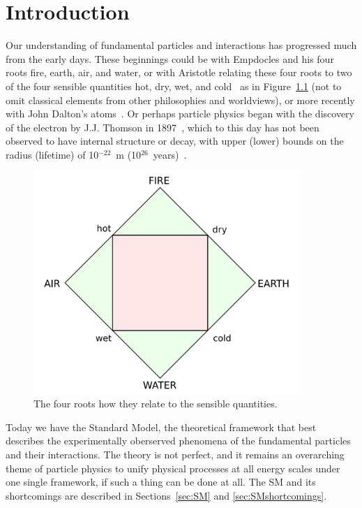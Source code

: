 
\chapter{Introduction\label{ch:intro}}

Our understanding of fundamental particles and interactions has progressed much from the early days.
These beginnings could be with Empdocles and his four roots fire, earth, air, and water, or with
Aristotle relating these four roots to two of the four sensible quantities hot, dry, wet, and
cold~\cite{0415078547} as in Figure~\ref{fig:aristotle}
(not to omit classical elements from other philosophies and worldviews), or more recently with
John Dalton's atoms~\cite{dalton}. Or perhaps particle physics began with
the discovery of the electron by J.J. Thomson in 1897~\cite{thomson:electron},
which to this day has not been observed
to have internal structure or decay, with upper (lower) bounds on the radius (lifetime) of
10$^{-22}$~m (10$^{26}$~years)~\cite{1988PhST...22..102D,2002PhLB..525...29B}.

\begin{figure}[ht]
 \begin{center}
    \includegraphics[width=0.90\textwidth]{figures/intro/Four_elements_representation.png}
      \end{center}
\caption{The four roots how they relate to the sensible quantities.}
\label{fig:aristotle}
\end{figure}

Today we have the Standard Model, the theoretical framework that best describes the
experimentally oberserved phenomena of the fundamental particles and their interactions. The theory
is not perfect, and it remains an overarching theme of particle physics to unify physical processes
at all energy scales under one single framework, if such a thing can be done at all.
The SM and its shortcomings are described in
Sections~\ref{sec:SM} and \ref{sec:SMshortcomings}.

